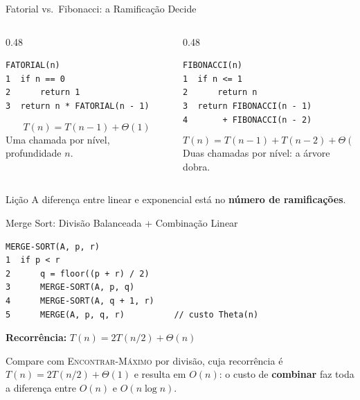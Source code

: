 \documentclass[aspectratio=169]{beamer}
\begin{document}
\begin{frame}{Fatorial vs.\ Fibonacci: a Ramificação Decide}
  \begin{columns}[T]
    \begin{column}{0.48\textwidth}
\begin{verbatim}
FATORIAL(n)
1  if n == 0
2      return 1
3  return n * FATORIAL(n - 1)
\end{verbatim}
      \[
        T(n) = T(n{-}1) + \Theta(1)
      \]
      Uma chamada por nível, profundidade $n$.

      \hfill{}
    \end{column}
    \begin{column}{0.48\textwidth}
\begin{verbatim}
FIBONACCI(n)
1  if n <= 1
2      return n
3  return FIBONACCI(n - 1)
4       + FIBONACCI(n - 2)
\end{verbatim}
      \[
        T(n) = T(n{-}1) + T(n{-}2) + \Theta(1)
      \]
      Duas chamadas por nível: a árvore dobra.

      \hfill{}
    \end{column}
  \end{columns}

  \vspace{0.3cm}
  \begin{alertblock}{Lição}
    A diferença entre linear e exponencial está no \textbf{número de ramificações}.
  \end{alertblock}
\end{frame}

\begin{frame}[fragile]{Merge Sort: Divisão Balanceada + Combinação Linear}
\begin{verbatim}
MERGE-SORT(A, p, r)
1  if p < r
2      q = floor((p + r) / 2)
3      MERGE-SORT(A, p, q)
4      MERGE-SORT(A, q + 1, r)
5      MERGE(A, p, q, r)          // custo Theta(n)
\end{verbatim}
  \textbf{Recorrência:} $T(n) = 2T(n/2) + \Theta(n)$

  \vspace{0.2cm}
  Compare com \textsc{Encontrar-Máximo} por divisão, cuja recorrência é
  $T(n) = 2T(n/2) + \Theta(1)$ e resulta em $O(n)$:
  o custo de \textbf{combinar} faz toda a diferença entre $O(n)$ e $O(n \log n)$.
\end{frame}
\end{document}
